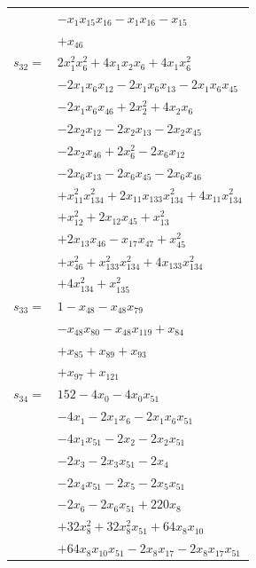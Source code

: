 \begin{longtable}{@{}r@{\;}l@{}}
 & \(\displaystyle -x_{1}x_{15}x_{16} -x_{1}x_{16} -x_{15}\) \\
 & \(\displaystyle +x_{46}\) \\[3pt]
\(s_{32}=\) & \(\displaystyle 2x_{1}^{2}x_{6}^{2} +4x_{1}x_{2}x_{6} +4x_{1}x_{6}^{2}\) \\
 & \(\displaystyle -2x_{1}x_{6}x_{12} -2x_{1}x_{6}x_{13} -2x_{1}x_{6}x_{45}\) \\
 & \(\displaystyle -2x_{1}x_{6}x_{46} +2x_{2}^{2} +4x_{2}x_{6}\) \\
 & \(\displaystyle -2x_{2}x_{12} -2x_{2}x_{13} -2x_{2}x_{45}\) \\
 & \(\displaystyle -2x_{2}x_{46} +2x_{6}^{2} -2x_{6}x_{12}\) \\
 & \(\displaystyle -2x_{6}x_{13} -2x_{6}x_{45} -2x_{6}x_{46}\) \\
 & \(\displaystyle +x_{11}^{2}x_{134}^{2} +2x_{11}x_{133}x_{134}^{2} +4x_{11}x_{134}^{2}\) \\
 & \(\displaystyle +x_{12}^{2} +2x_{12}x_{45} +x_{13}^{2}\) \\
 & \(\displaystyle +2x_{13}x_{46} -x_{17}x_{47} +x_{45}^{2}\) \\
 & \(\displaystyle +x_{46}^{2} +x_{133}^{2}x_{134}^{2} +4x_{133}x_{134}^{2}\) \\
 & \(\displaystyle +4x_{134}^{2} +x_{135}^{2}\) \\[3pt]
\(s_{33}=\) & \(\displaystyle 1 -x_{48} -x_{48}x_{79}\) \\
 & \(\displaystyle -x_{48}x_{80} -x_{48}x_{119} +x_{84}\) \\
 & \(\displaystyle +x_{85} +x_{89} +x_{93}\) \\
 & \(\displaystyle +x_{97} +x_{121}\) \\[3pt]
\(s_{34}=\) & \(\displaystyle 152 -4x_{0} -4x_{0}x_{51}\) \\
 & \(\displaystyle -4x_{1} -2x_{1}x_{6} -2x_{1}x_{6}x_{51}\) \\
 & \(\displaystyle -4x_{1}x_{51} -2x_{2} -2x_{2}x_{51}\) \\
 & \(\displaystyle -2x_{3} -2x_{3}x_{51} -2x_{4}\) \\
 & \(\displaystyle -2x_{4}x_{51} -2x_{5} -2x_{5}x_{51}\) \\
 & \(\displaystyle -2x_{6} -2x_{6}x_{51} +220x_{8}\) \\
 & \(\displaystyle +32x_{8}^{2} +32x_{8}^{2}x_{51} +64x_{8}x_{10}\) \\
 & \(\displaystyle +64x_{8}x_{10}x_{51} -2x_{8}x_{17} -2x_{8}x_{17}x_{51}\) \\

\end{longtable}
